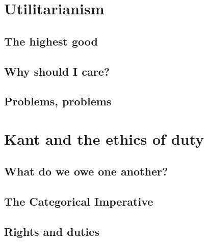 \documentclass[]{book}
\begin{document}
\hypertarget{utilitarianism}{%
\chapter{Utilitarianism}\label{utilitarianism}}

\hypertarget{the-highest-good}{%
\section{The highest good}\label{the-highest-good}}

\hypertarget{why-should-i-care}{%
\section{Why should I care?}\label{why-should-i-care}}

\hypertarget{problems-problems}{%
\section{Problems, problems}\label{problems-problems}}

\hypertarget{kant-and-the-ethics-of-duty}{%
\chapter{Kant and the ethics of duty}\label{kant-and-the-ethics-of-duty}}

\hypertarget{what-do-we-owe-one-another}{%
\section{What do we owe one another?}\label{what-do-we-owe-one-another}}

\hypertarget{the-categorical-imperative}{%
\section{The Categorical Imperative}\label{the-categorical-imperative}}

\hypertarget{rights-and-duties}{%
\section{Rights and duties}\label{rights-and-duties}}


\end{document}
